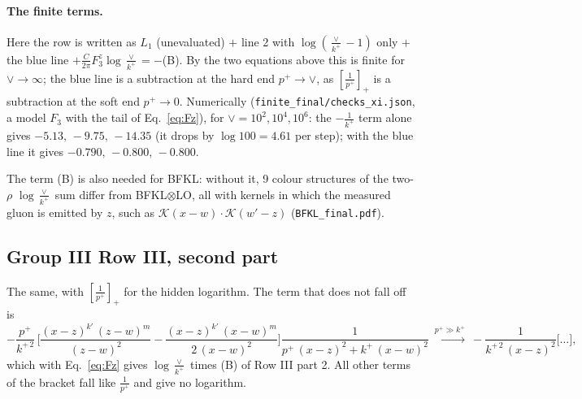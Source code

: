 \documentclass[10pt]{article}
\numberwithin{equation}{section}
\begin{document}
\paragraph{The finite terms.} Here the row is written as $L_1$ (unevaluated) $+$ line 2 with $\log(\frac{\vee}{k^+}-1)$ only $+$ the blue line $+\frac{C}{2\pi}F_3^z\log\frac{\vee}{k^+}=-$(B). By the two equations above this is finite for $\vee\to\infty$; the blue line is a subtraction at the hard end $p^+\to\vee$, as $\left[\frac{1}{p^+}\right]_+$ is a subtraction at the soft end $p^+\to0$. Numerically (\texttt{finite\_final/checks\_xi.json}, a model $F_3$ with the tail of Eq.~\eqref{eq:Fz}), for $\vee=10^2,10^4,10^6$: the $-\frac{1}{k^+}$ term alone gives $-5.13,\,-9.75,\,-14.35$ (it drops by $\log100=4.61$ per step); with the blue line it gives $-0.790,\,-0.800,\,-0.800$.

The term (B) is also needed for BFKL: without it, 9 colour structures of the two-$\rho$ $\log\frac{\vee}{k^+}$ sum differ from BFKL$\otimes$LO, all with kernels in which the measured gluon is emitted by $z$, such as $\mathcal K(x-w)\cdot\mathcal K(w'-z)$ (\texttt{BFKL\_final.pdf}).

\subsection{Group III Row III, second part}
The same, with $\left[\frac{1}{p^+}\right]_+$ for the hidden logarithm. The term that does not fall off is
\begin{equation*}
-\frac{p^{+}}{k^{+\,2}}\,\bigg[\frac{(x-z)^{k'}\,(z-w)^{m}}{(z-w)^{2}} -\frac{(x-z)^{k'}\,(x-w)^{m}}{2\,(x-w)^{2}}\bigg]\frac{1}{p^{+}\,(x-z)^{2}+k^{+}\,(x-w)^{2}}\ \xrightarrow{p^+\gg k^+}\ -\frac{1}{k^{+\,2}\,(x-z)^{2}}\bigg[\dots\bigg],
\end{equation*}
which with Eq.~\eqref{eq:Fz} gives $\log\frac{\vee}{k^+}$ times (B) of Row III part 2. All other terms of the bracket fall like $\frac{1}{p^+}$ and give no logarithm.
\end{document}
